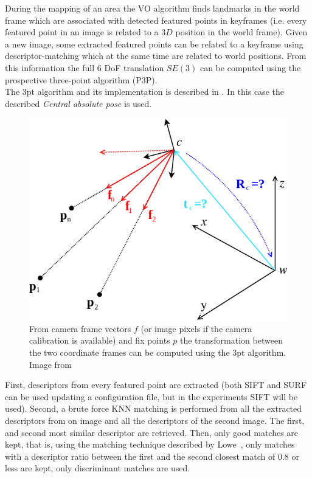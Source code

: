 During the mapping of an area the VO algorithm finds landmarks in the world frame which are associated with detected featured points in keyframes (i.e. every featured point in an image is related to a $3D$ position in the world frame). Given a new image, some extracted featured points can be related to a keyframe using descriptor-matching which at the same time are related to world positions. From this information the full 6 DoF translation $SE(3)$ can be computed using the prospective three-point algorithm (P3P).\\

The 3pt algorithm and its implementation is described in \cite{kneipopengv}. In this case the described \textit{Central absolute pose} is used.

\begin{figure}[htpb]
  \centering
  \includegraphics[width=0.6\linewidth]{img/absolute_central.png}
  \caption{From camera frame vectors $f$ (or image pixels if the camera calibration is available) and fix points $p$ the transformation between the two coordinate frames can be computed using the 3pt algorithm. Image from \cite{kneipopengv}}
  \label{fig:img/absolute_centra}
\end{figure}

First, descriptors from every featured point are extracted (both SIFT and SURF can be used updating a configuration file, but in the experiments SIFT will be used). Second, a brute force KNN matching is performed from all the extracted descriptors from on image and all the descriptors of the second image. The first, and second most similar descriptor are retrieved. Then, only good matches are kept, that is, using the matching technique described by Lowe~\cite{lowe2004distinctive}, only matches with a descriptor ratio between the first and the second closest match of 0.8 or less are kept, only discriminant matches are used.\\

